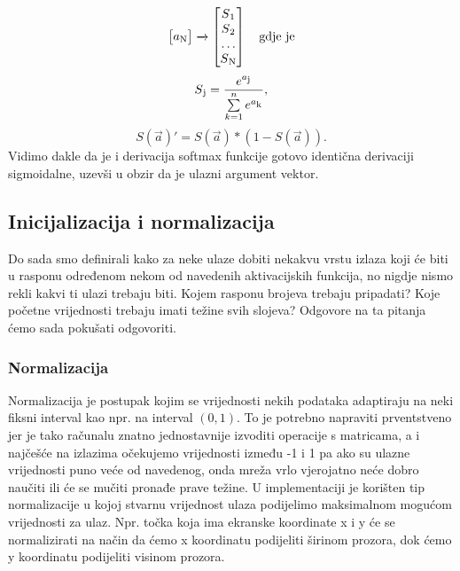 \documentclass[times, utf8, zavrsni]{fer}
\begin{document}
\begin{enumerate}
\[\begin{bmatrix}
            a\textsubscript{N}
        \end{bmatrix}
        \xrightarrow{}
        \begin{bmatrix}
            S\textsubscript{1} \\
            S\textsubscript{2} \\
            \dots \\
            S\textsubscript{N}
        \end{bmatrix} \quad \text{gdje je}
    \]
    \begin{equation}
        \label{eq:soft}
        S\textsubscript{j} = \frac{e^{a\textsubscript{j}}}{\sum\limits_{k=1}^ne^{a\textsubscript{k}}},
    \end{equation}
    \begin{equation}
        \label{eq:soft-der}
        S(\vec{a})' = S(\vec{a}) * (1 - S(\vec{a})).
    \end{equation}
    Vidimo dakle da je i derivacija softmax funkcije gotovo identična derivaciji sigmoidalne, uzevši u obzir da je ulazni argument vektor.
\end{enumerate}

\subsection{Inicijalizacija i normalizacija}
Do sada smo definirali kako za neke ulaze dobiti nekakvu vrstu izlaza koji će biti u rasponu određenom nekom od navedenih aktivacijskih funkcija, no nigdje nismo rekli kakvi ti ulazi trebaju biti. Kojem rasponu brojeva trebaju pripadati? Koje početne vrijednosti trebaju imati težine svih slojeva? Odgovore na ta pitanja ćemo sada pokušati odgovoriti.

\subsubsection{Normalizacija}
Normalizacija  je postupak kojim se vrijednosti nekih podataka adaptiraju na neki fiksni interval kao npr. na interval $(0, 1)$. To je potrebno napraviti prventstveno jer je tako računalu znatno jednostavnije izvoditi operacije s matricama, a i najčešće na izlazima očekujemo vrijednosti između -1 i 1 pa ako su ulazne vrijednosti puno veće od navedenog, onda mreža vrlo vjerojatno neće dobro naučiti ili će se mučiti pronađe prave težine. U implementaciji je korišten tip normalizacije u kojoj stvarnu vrijednost ulaza podijelimo maksimalnom mogućom vrijednosti za ulaz. Npr. točka koja ima ekranske koordinate x i y će se normalizirati na način da ćemo x koordinatu podijeliti širinom prozora, dok ćemo y koordinatu podijeliti visinom prozora.
\end{document}
